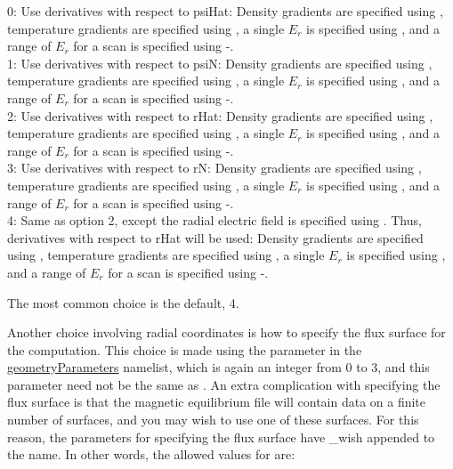 {\setlength{\parindent}{0cm}

0: Use derivatives with respect to {\ttfamily psiHat}: Density gradients are specified using , 
temperature gradients are specified using ,  a single $E_r$ is specified using
, and a range of $E_r$ for a scan is specified using -.
\\

1: Use derivatives with respect to {\ttfamily psiN}: Density gradients are specified using , 
temperature gradients are specified using ,  a single $E_r$ is specified using
, and a range of $E_r$ for a scan is specified using -.
\\

2: Use derivatives with respect to {\ttfamily rHat}: Density gradients are specified using , 
temperature gradients are specified using ,  a single $E_r$ is specified using
, and a range of $E_r$ for a scan is specified using -.
\\

3: Use derivatives with respect to {\ttfamily rN}: Density gradients are specified using , 
temperature gradients are specified using ,  a single $E_r$ is specified using
, and a range of $E_r$ for a scan is specified using -.
\\

4: Same as option 2, except the radial electric field is specified using . Thus, derivatives with respect to {\ttfamily rHat} will be used:
Density gradients are specified using , 
temperature gradients are specified using ,  a single $E_r$ is specified using
, and a range of $E_r$ for a scan is specified using -.
\\
}

The most common choice is the default, 4.

Another choice involving radial coordinates is how to specify the flux surface for the computation.
This choice is made using the parameter  in the {\ttfamily \hyperref[sec:geometryParameters]{geometryParameters}}
namelist, which is again an integer from 0 to 3, and this parameter need not be the same as .
An extra complication with specifying the flux surface is that the magnetic equilibrium file will contain data on a finite number of surfaces,
and you may wish to use one of these surfaces.  For this reason, the parameters for specifying the flux surface have {\ttfamily \_wish}
appended to the name. In other words, the allowed values for  are:\\

